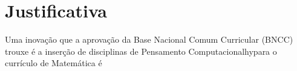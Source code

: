 \documentclass[12pt]{abntex2}
\begin{document}
\imprimircapa
\imprimirfolhaderosto
\section{Justificativa}

Uma inovação que a aprovação da Base Nacional Comum Curricular (BNCC) trouxe é a inserção de disciplinas de Pensamento Computacionalhypara o currículo de Matemática é  
\end{document}

